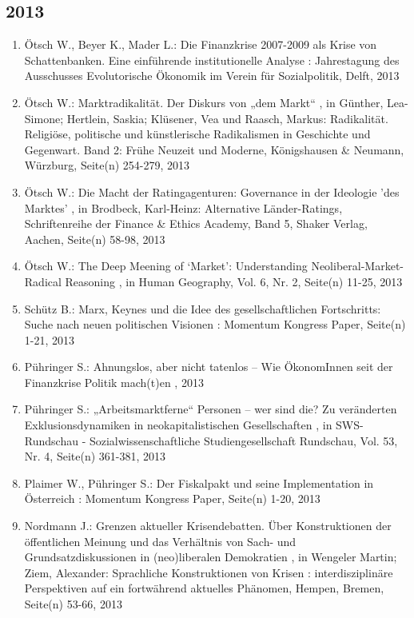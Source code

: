  \subsection*{2013} 
 \begin{enumerate}[leftmargin=*, labelsep=0.5cm] 
	 \item Ötsch W., Beyer K., Mader L.:  Die Finanzkrise 2007-2009 als Krise von Schattenbanken. Eine einführende institutionelle Analyse  : Jahrestagung des Ausschusses Evolutorische Ökonomik im Verein für Sozialpolitik, Delft, 2013
	 \item Ötsch W.:  Marktradikalität. Der Diskurs von „dem Markt“  , in Günther, Lea-Simone; Hertlein, Saskia;  Klüsener, Vea und Raasch, Markus: Radikalität. Religiöse, politische und künstlerische Radikalismen in Geschichte und Gegenwart.  Band 2: Frühe Neuzeit und Moderne, Königshausen & Neumann, Würzburg, Seite(n) 254-279, 2013
	 \item Ötsch W.:  Die Macht der Ratingagenturen: Governance in der Ideologie 'des Marktes'  , in Brodbeck, Karl-Heinz: Alternative Länder-Ratings, Schriftenreihe der Finance & Ethics Academy, Band 5, Shaker Verlag, Aachen, Seite(n) 58-98, 2013
	 \item Ötsch W.:  The Deep Meening of ‘Market’: Understanding Neoliberal-Market-Radical Reasoning  , in Human Geography, Vol. 6, Nr. 2, Seite(n) 11-25, 2013
	 \item Schütz B.:  Marx, Keynes und die Idee des gesellschaftlichen Fortschritts: Suche nach neuen politischen Visionen  : Momentum Kongress Paper, Seite(n) 1-21, 2013
	 \item Pühringer S.:  Ahnungslos, aber nicht tatenlos – Wie ÖkonomInnen seit der Finanzkrise Politik mach(t)en  , 2013
	 \item Pühringer S.:  „Arbeitsmarktferne“ Personen – wer sind die? Zu veränderten Exklusionsdynamiken in neokapitalistischen Gesellschaften  , in SWS-Rundschau - Sozialwissenschaftliche Studiengesellschaft Rundschau, Vol. 53, Nr. 4, Seite(n) 361-381, 2013
	 \item Plaimer W., Pühringer S.:  Der Fiskalpakt und seine Implementation in Österreich  : Momentum Kongress Paper, Seite(n) 1-20, 2013
	 \item Nordmann J.:  Grenzen aktueller Krisendebatten. Über Konstruktionen der öffentlichen Meinung und das Verhältnis von Sach- und Grundsatzdiskussionen in (neo)liberalen Demokratien  , in Wengeler Martin; Ziem, Alexander: Sprachliche Konstruktionen von Krisen : interdisziplinäre Perspektiven auf ein fortwährend aktuelles Phänomen, Hempen, Bremen, Seite(n) 53-66, 2013

\end{enumerate}
